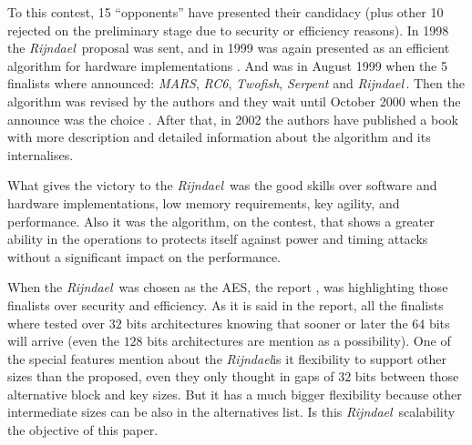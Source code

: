 \documentclass[10pt,a4paper,twoside]{llncs}
\newcommand{\rijndael}{\emph{Rijndael}}
\begin{document}
To this contest, 15 ``opponents'' have presented their candidacy (plus other 10 rejected on the preliminary stage due to security or efficiency reasons). In 1998 the \rijndael\, proposal \cite{Daemen98aesproposal:} was sent, and in 1999 was again presented as an efficient algorithm for hardware implementations \cite{Daemen:1998:BCR:646692.759487}. And was in August 1999 when the 5 finalists where announced: \emph{MARS}, \emph{RC6}, \emph{Twofish}, \emph{Serpent} and \rijndael\,. Then the algorithm was revised by the authors \cite{Daemen01aes-ammended} and they wait until October 2000 when the announce was the choice  \cite{AES-FIPS}. After that, in 2002 the authors have published a book \cite{Daemen:2002:DR:560131} with more description and detailed information about the algorithm and its internalises.

What gives the victory to the \rijndael\, was the good skills over software and hardware implementations, low memory requirements, key agility, and performance. Also it was the algorithm, on the contest, that shows a greater ability in the operations to protects itself against power and timing attacks without a significant impact on the performance.

When the \rijndael\, was chosen as the AES, the report \cite{AES-report}, was highlighting those finalists over security and efficiency. As it is said in the report, all the finalists where tested over $32$ bits architectures knowing that sooner or later the $64$ bits will arrive (even the $128$ bits architectures are mention as a possibility). One of the special features mention about the \rijndael is it flexibility to support other sizes than the proposed, even they only thought in gaps of $32$ bits between those alternative block and key sizes. But it has a much bigger flexibility because other intermediate sizes can be also in the alternatives list. Is this \rijndael\, scalability the objective of this paper.
\end{document}
